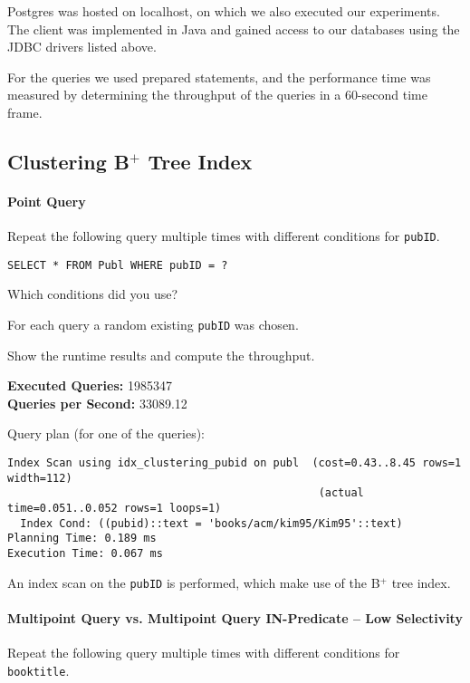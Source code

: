 \documentclass[11pt]{scrartcl}
\begin{document}
Postgres was hosted on localhost, on which we also executed our experiments.
The client was implemented in Java and gained access to our databases using the JDBC drivers listed above.

For the queries we used prepared statements, and the performance time was measured by determining the throughput of the
queries in a 60-second time frame.

\subsection*{Clustering B$^+$ Tree Index}

\paragraph{Point Query}

Repeat the following query multiple times with different conditions for \texttt{pubID}.

\begin{lstlisting}[style=dbtsql]
SELECT * FROM Publ WHERE pubID = ?
\end{lstlisting}

Which conditions did you use?

For each query a random existing \texttt{pubID} was chosen.

Show the runtime results and compute the throughput.

\textbf{Executed Queries: } 1985347 \\
\textbf{Queries per Second: } 33089.12

Query plan (for one of the queries):

{\small
\parskip0pt\begin{verbatim}
Index Scan using idx_clustering_pubid on publ  (cost=0.43..8.45 rows=1 width=112)
                                                (actual time=0.051..0.052 rows=1 loops=1)
  Index Cond: ((pubid)::text = 'books/acm/kim95/Kim95'::text)
Planning Time: 0.189 ms
Execution Time: 0.067 ms
\end{verbatim}}

An index scan on the \texttt{pubID} is performed, which make use of the B$^+$ tree index.

\paragraph{Multipoint Query vs. Multipoint Query IN-Predicate -- Low Selectivity}

Repeat the following query multiple times with different conditions for \texttt{booktitle}.
\end{document}
